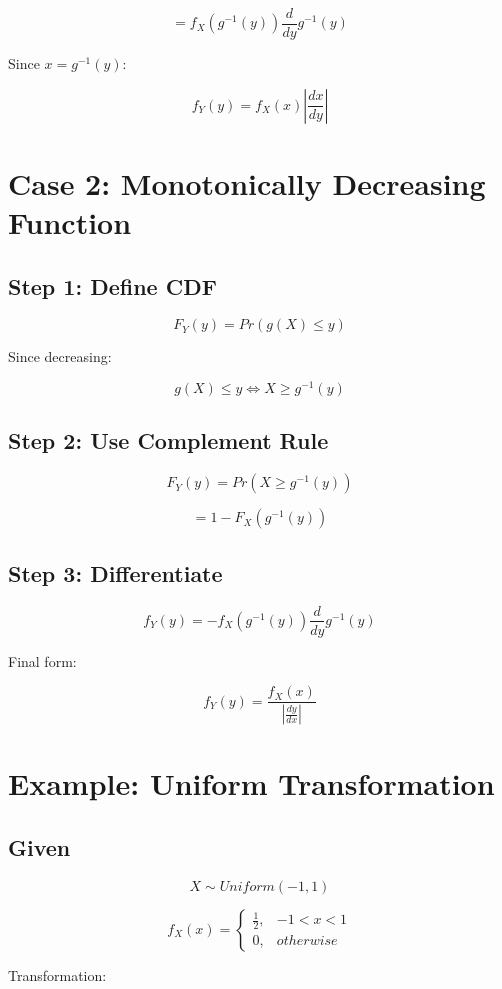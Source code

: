 \documentclass[12pt]{article}
\begin{document}
\[
=
f_X(g^{-1}(y))
\frac{d}{dy}g^{-1}(y)
\]

Since $x = g^{-1}(y)$:

\[
\boxed{
f_Y(y)
=
f_X(x)
\left|
\frac{dx}{dy}
\right|
}
\]

\section{Case 2: Monotonically Decreasing Function}

\subsection{Step 1: Define CDF}

\[
F_Y(y)
=
Pr(g(X) \le y)
\]

Since decreasing:

\[
g(X) \le y \iff X \ge g^{-1}(y)
\]

\subsection{Step 2: Use Complement Rule}

\[
F_Y(y)
=
Pr(X \ge g^{-1}(y))
\]

\[
=
1 - F_X(g^{-1}(y))
\]

\subsection{Step 3: Differentiate}

\[
f_Y(y)
=
-
f_X(g^{-1}(y))
\frac{d}{dy}g^{-1}(y)
\]

Final form:

\[
\boxed{
f_Y(y)
=
\frac{f_X(x)}
{\left|\frac{dy}{dx}\right|}
}
\]

\section{Example: Uniform Transformation}

\subsection{Given}

\[
X \sim Uniform(-1,1)
\]

\[
f_X(x) =
\begin{cases}
\frac{1}{2}, & -1<x<1 \\
0, & otherwise
\end{cases}
\]

Transformation:
\end{document}
